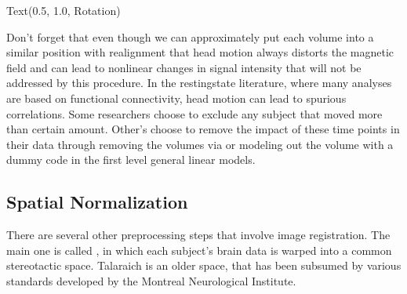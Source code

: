 \documentclass[letterpaper,10pt,english]{sphinxmanual}
\begin{document}
\begin{sphinxVerbatim}[commandchars=\\\{\}]
\PYG{p}{[}\PYG{p}{[}\PYG{p}{]}\PYG{p}{]}\PYG{p}{[}\PYG{p}{]}
\PYG{p}{[}\PYG{p}{]} 
\PYG{p}{[}\PYG{p}{]} 
\PYG{p}{[}\PYG{p}{]} 
\end{sphinxVerbatim}

\begin{sphinxVerbatim}[commandchars=\\\{\}]
Text(0.5, 1.0, \PYGZsq{}Rotation\PYGZsq{})
\end{sphinxVerbatim}

\noindent{}

Don’t forget that even though we can approximately put each volume into a similar position with realignment that head motion always distorts the magnetic field and can lead to nonlinear changes in signal intensity that will not be addressed by this procedure. In the resting\sphinxhyphen{}state literature, where many analyses are based on functional connectivity, head motion can lead to spurious correlations. Some researchers choose to exclude any subject that moved more than certain amount. Other’s choose to remove the impact of these time points in their data through removing the volumes via  or modeling out the volume with a dummy code in the first level general linear models.


\subsection{Spatial Normalization}
\label{\detokenize{content/Preprocessing:spatial-normalization}}
There are several other preprocessing steps that involve image registration. The main one is called , in which each subject’s brain data is warped into a common stereotactic space. Talaraich is an older space, that has been subsumed by various standards developed by the Montreal Neurological Institute.
\end{document}
